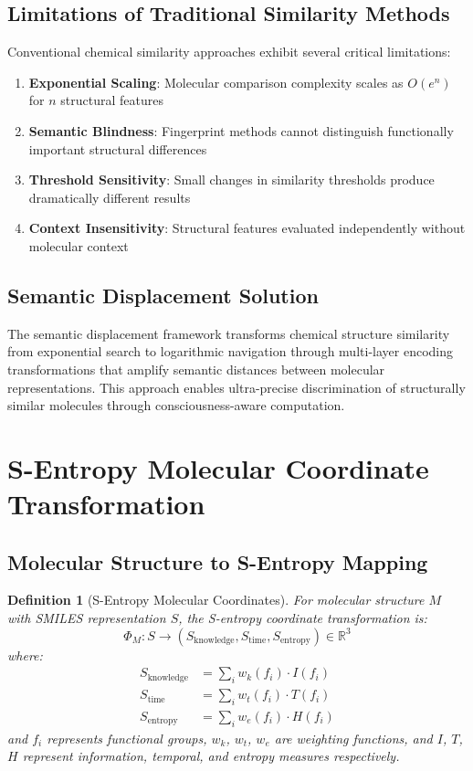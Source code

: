 \documentclass[12pt,a4paper]{article}
\newtheorem{definition}[theorem]{Definition}
\begin{document}
\subsection{Limitations of Traditional Similarity Methods}

Conventional chemical similarity approaches exhibit several critical limitations:

\begin{enumerate}
\item \textbf{Exponential Scaling}: Molecular comparison complexity scales as $O(e^n)$ for $n$ structural features
\item \textbf{Semantic Blindness}: Fingerprint methods cannot distinguish functionally important structural differences
\item \textbf{Threshold Sensitivity}: Small changes in similarity thresholds produce dramatically different results
\item \textbf{Context Insensitivity}: Structural features evaluated independently without molecular context
\end{enumerate}

\subsection{Semantic Displacement Solution}

The semantic displacement framework transforms chemical structure similarity from exponential search to logarithmic navigation through multi-layer encoding transformations that amplify semantic distances between molecular representations. This approach enables ultra-precise discrimination of structurally similar molecules through consciousness-aware computation.

\section{S-Entropy Molecular Coordinate Transformation}

\subsection{Molecular Structure to S-Entropy Mapping}

\begin{definition}[S-Entropy Molecular Coordinates]
For molecular structure $M$ with SMILES representation $S$, the S-entropy coordinate transformation is:
\begin{equation}
\Phi_M: S \rightarrow (S_{\text{knowledge}}, S_{\text{time}}, S_{\text{entropy}}) \in \mathbb{R}^3
\end{equation}
where:
\begin{align}
S_{\text{knowledge}} &= \sum_{i} w_k(f_i) \cdot I(f_i) \\
S_{\text{time}} &= \sum_{i} w_t(f_i) \cdot T(f_i) \\
S_{\text{entropy}} &= \sum_{i} w_e(f_i) \cdot H(f_i)
\end{align}
and $f_i$ represents functional groups, $w_k$, $w_t$, $w_e$ are weighting functions, and $I$, $T$, $H$ represent information, temporal, and entropy measures respectively.
\end{definition}
\end{document}
